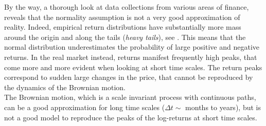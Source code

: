 By the way, a thorough look at data collections from various areas of finance, reveals that the normality assumption 
is not a very good approximation of reality.
Indeed, empirical return distributions have substantially 
more mass around the origin and along the tails (\emph{heavy tails}), see \cite{Cont01}.
This means that the normal distribution underestimates the probability of large positive and negative returns. 
In the real market instead, returns manifest frequently high peaks, that come more and more evident when 
looking at short time scales.
The return peaks correspond to sudden large changes in the price, that cannot be reproduced by the dynamics of the Brownian motion.\\
The Brownian motion, which is a scale invariant process with continuous paths, can be a good approximation for long 
time scales ($\Delta t \sim$ months to years), but is not a good model to reproduce 
the peaks of the log-returns at short time scales.

